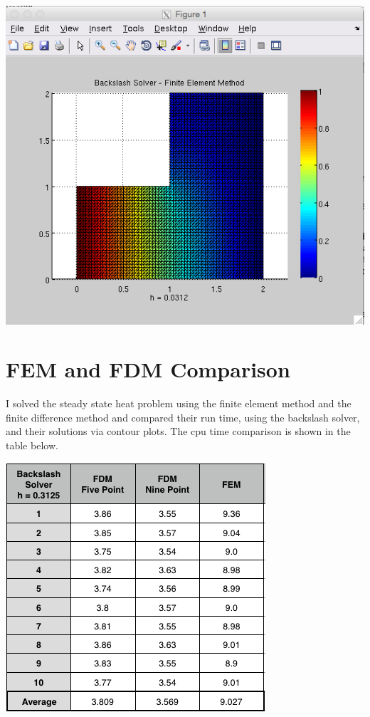 \documentclass[11pt, oneside]{article}   	%
\begin{document}
\centerline{\includegraphics[scale = 0.55]{Backslash_h5.png}}

\vspace{5mm}

\section{FEM and FDM Comparison}

I solved the steady state heat problem using the finite element method and the finite difference method and compared their run time, using the backslash solver, and their solutions via contour plots. The cpu time comparison is shown in the table below. \\

\centerline{\includegraphics[scale = 0.7]{TimeComparisons.png}}
\end{document}
